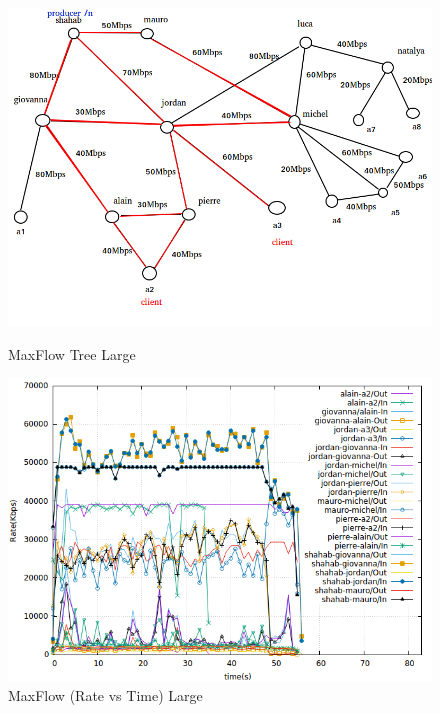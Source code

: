 \begin{figure}[H]

\begin{center}

\includegraphics[scale = 0.4]{Figures/MaxFlow_big.png}

\caption{MaxFlow Tree Large} \label{MaxFlow_big} 


\includegraphics[scale = 0.4]{Figures/maxflow_big.png}

\caption{MaxFlow (Rate vs Time) Large} \label{maxflow_big} 


\end{center}

\end{figure}



